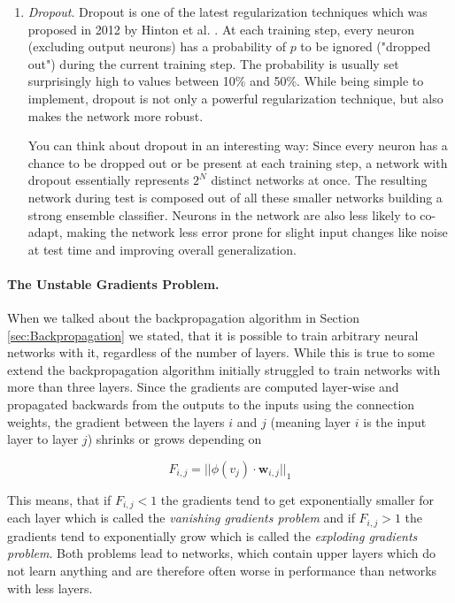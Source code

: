 \begin{enumerate}
\begin{itemize}
  \end{itemize}
  
  \item \textit{Dropout}. Dropout is one of the latest regularization techniques which was proposed in 2012 by Hinton et al. \cite{hinton2012improving}. At each training step, every neuron (excluding output neurons) has a probability of $p$ to be ignored ("dropped out") during the current training step. The probability is usually set surprisingly high to values between 10\% and 50\%. While being simple to implement, dropout is not only a powerful regularization technique, but also makes the network more robust. 
  
  You can think about dropout in an interesting way: Since every neuron has a chance to be dropped out or be present at each training step, a network with dropout essentially represents $2^N$ distinct networks at once. The resulting network during test is composed out of all these smaller networks building a strong ensemble classifier. Neurons in the network are also less likely to co-adapt, making the network less error prone for slight input changes like noise at test time and improving overall generalization.  
\end{enumerate}



\paragraph{The Unstable Gradients Problem.}
When we talked about the backpropagation algorithm in Section \ref{sec:Backpropagation} we stated, that it is possible to train arbitrary neural networks with it, regardless of the number of layers. While this is true to some extend the backpropagation algorithm initially struggled to train networks with more than three layers. Since the gradients are computed layer-wise and propagated backwards from the outputs to the inputs using the connection weights, the gradient between the layers $i$ and $j$ (meaning layer $i$ is the input layer to layer $j$) shrinks or grows depending on 

\[F_{i,j} = ||\phi(v_j) \cdot \mathbf{w}_{i, j}||_1\]

This means, that if $F_{i, j} < 1$ the gradients tend to get exponentially smaller for each layer which is called the \textit{vanishing gradients problem} and if $F_{i, j} > 1$ the gradients tend to exponentially grow which is called the \textit{exploding gradients problem}. Both problems lead to networks, which contain upper layers which do not learn anything and are therefore often worse in performance than networks with less layers.

